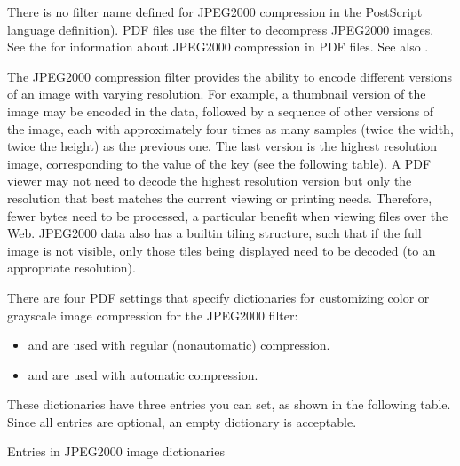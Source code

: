 \documentclass[letterpaper,12pt,english,openany,oneside]{sphinxmanual}
\begin{document}
There is no filter name defined for JPEG2000 compression in the PostScript language definition). PDF files use the  filter to decompress JPEG2000 images. See the  for information about JPEG2000 compression in PDF files. See also  .

The JPEG2000 compression filter provides the ability to encode different versions of an image with varying resolution. For example, a thumbnail version of the image may be encoded in the data, followed by a sequence of other versions of the image, each with approximately four times as many samples (twice the width, twice the height) as the previous one. The last version is the highest resolution image, corresponding to the value of the  key (see the following table). A PDF viewer may not need to decode the highest resolution version but only the resolution that best matches the current viewing or printing needs. Therefore, fewer bytes need to be processed, a particular benefit when viewing files over the Web. JPEG2000 data also has a built\sphinxhyphen{}in tiling structure, such that if the full image is not visible, only those tiles being displayed need to be decoded (to an appropriate resolution).

There are four PDF settings that specify dictionaries for customizing color or grayscale image compression for the JPEG2000 filter:
\begin{itemize}
\item {} 
 and  are used with regular (non\sphinxhyphen{}automatic) compression.

\item {} 
 and  are used with automatic compression.

\end{itemize}

These dictionaries have three entries you can set, as shown in the following table. Since all entries are optional, an empty dictionary is acceptable.

Entries in JPEG2000 image dictionaries
\end{document}
